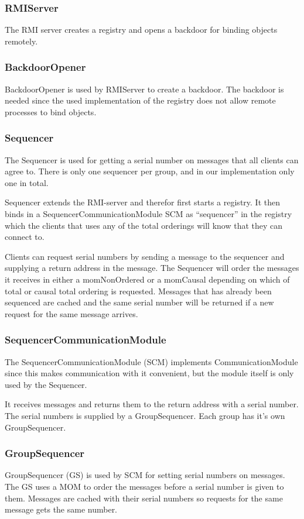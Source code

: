 \documentclass[english]{article}
\begin{document}
\subsubsection{RMIServer}
The RMI server creates a registry and opens a backdoor for binding objects remotely.

\subsubsection{BackdoorOpener}
BackdoorOpener is used by RMIServer to create a backdoor. The backdoor is needed since the used implementation of the registry does not allow remote processes to bind objects.

\subsubsection{Sequencer}
The Sequencer is used for getting a serial number on messages that all clients can agree to. There is only one sequencer per group, and in our implementation only one in total.

Sequencer extends the RMI-server and therefor first starts a registry. It then binds in a SequencerCommunicationModule SCM as ``sequencer'' in the registry which the clients that uses any of the total orderings will know that they can connect to. 

Clients can request serial numbers by sending a message to the sequencer and supplying a return address in the message. The Sequencer will order the messages it receives in either a momNonOrdered or a momCausal depending on which of total or causal total ordering is requested. Messages that has already been sequenced are cached and the same serial number will be returned if a new request for the same message arrives.

\subsubsection{SequencerCommunicationModule}
The SequencerCommunicationModule (SCM) implements CommunicationModule since this makes communication with it convenient, but the module itself is only used by the Sequencer. 

It receives messages and returns them to the return address with a serial number. The serial numbers is supplied by a GroupSequencer. Each group has it's own GroupSequencer.

\subsubsection{GroupSequencer}
GroupSequencer (GS) is used by SCM for setting serial numbers on messages. The GS uses a MOM to order the messages before a serial number is given to them. Messages are cached with their serial numbers so requests for the same message gets the same number. 
\end{document}
